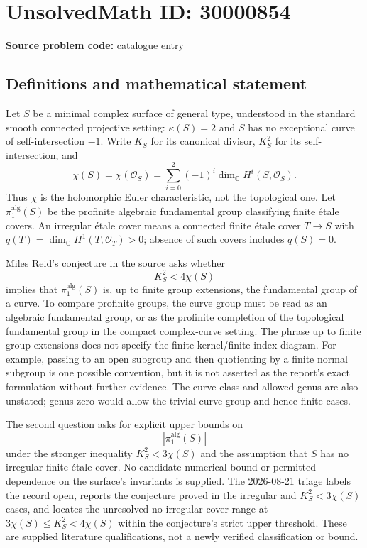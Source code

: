 \documentclass[11pt]{article}
\newcommand{\C}{\mathbb{C}}
\begin{document}
\section*{UnsolvedMath ID: 30000854}
\textbf{Source problem code:} catalogue entry
\subsection{Definitions and mathematical statement}
Let $S$ be a minimal complex surface of general type, understood in the standard smooth connected projective setting: $\kappa(S)=2$ and $S$ has no exceptional curve of self-intersection $-1$. Write $K_S$ for its canonical divisor, $K_S^2$ for its self-intersection, and \[\chi(S)=\chi(\mathcal O_S)=\sum_{i=0}^2(-1)^i\dim_\C H^i(S,\mathcal O_S).\] Thus $\chi$ is the holomorphic Euler characteristic, not the topological one. Let $\pi_1^{\mathrm{alg}}(S)$ be the profinite algebraic fundamental group classifying finite \'etale covers. An irregular \'etale cover means a connected finite \'etale cover $T\to S$ with $q(T)=\dim_\C H^1(T,\mathcal O_T)>0$; absence of such covers includes $q(S)=0$.\par Miles Reid's conjecture in the source asks whether \[K_S^2<4\chi(S)\] implies that $\pi_1^{\mathrm{alg}}(S)$ is, up to finite group extensions, the fundamental group of a curve. To compare profinite groups, the curve group must be read as an algebraic fundamental group, or as the profinite completion of the topological fundamental group in the compact complex-curve setting. The phrase up to finite group extensions does not specify the finite-kernel/finite-index diagram. For example, passing to an open subgroup and then quotienting by a finite normal subgroup is one possible convention, but it is not asserted as the report's exact formulation without further evidence. The curve class and allowed genus are also unstated; genus zero would allow the trivial curve group and hence finite cases.\par The second question asks for explicit upper bounds on \[|\pi_1^{\mathrm{alg}}(S)|\] under the stronger inequality $K_S^2<3\chi(S)$ and the assumption that $S$ has no irregular finite \'etale cover. No candidate numerical bound or permitted dependence on the surface's invariants is supplied. The 2026-08-21 triage labels the record open, reports the conjecture proved in the irregular and $K_S^2<3\chi(S)$ cases, and locates the unresolved no-irregular-cover range at $3\chi(S)\leq K_S^2<4\chi(S)$ within the conjecture's strict upper threshold. These are supplied literature qualifications, not a newly verified classification or bound.
\end{document}
